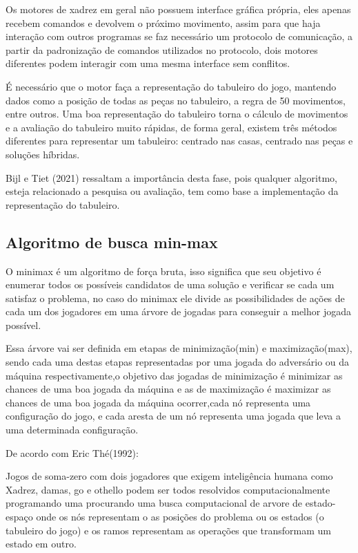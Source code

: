 Os motores de xadrez em geral não possuem interface gráfica própria, eles apenas recebem comandos e devolvem o próximo
movimento, assim para que haja interação com outros programas se faz necessário um protocolo de comunicação, a partir
da padronização de comandos utilizados no protocolo, dois motores diferentes podem interagir com uma mesma interface
sem conflitos.

É necessário que o motor faça a representação do tabuleiro do jogo, mantendo dados como a posição de todas as peças no tabuleiro,
a regra de 50 movimentos, entre outros. Uma boa representação do tabuleiro torna o cálculo de movimentos e a avaliação do tabuleiro
muito rápidas, de forma geral, existem três métodos diferentes para representar um tabuleiro: centrado nas casas, centrado nas peças
e soluções híbridas.

Bijl e Tiet (2021) ressaltam a importância desta fase, pois qualquer algoritmo, esteja relacionado a pesquisa
ou avaliação, tem como base a implementação da representação do tabuleiro.

\subsection{Algoritmo de busca min-max}

O minimax é um algoritmo de força bruta, isso significa que seu objetivo é enumerar todos os possíveis candidatos de uma solução e verificar
se cada um satisfaz o problema, no caso do minimax ele divide as possibilidades de ações de cada um dos jogadores em uma árvore de jogadas para
conseguir a melhor jogada possível.

Essa árvore vai ser definida em etapas de minimização(min) e maximização(max), sendo cada uma destas etapas representadas por uma jogada do
adversário ou da máquina respectivamente,o objetivo das jogadas de minimização é minimizar as chances de uma boa jogada da máquina e as de
maximização é maximizar as chances de uma boa jogada da máquina ocorrer,cada nó representa uma configuração do jogo, e cada aresta de um nó representa
uma jogada que leva a uma determinada configuração.

De acordo com Eric Thé(1992):
\begin{citacao}
    Jogos de soma-zero com dois jogadores que exigem inteligência humana como Xadrez, damas, go e othello
    podem ser todos resolvidos computacionalmente programando uma procurando uma busca computacional de
    arvore de estado-espaço onde os nós representam o as posições do problema ou os estados (o tabuleiro do jogo)
    e os ramos representam as operações que transformam um estado em outro.\cite[tradução nossa.]{ERICTHE}
\end{citacao}

